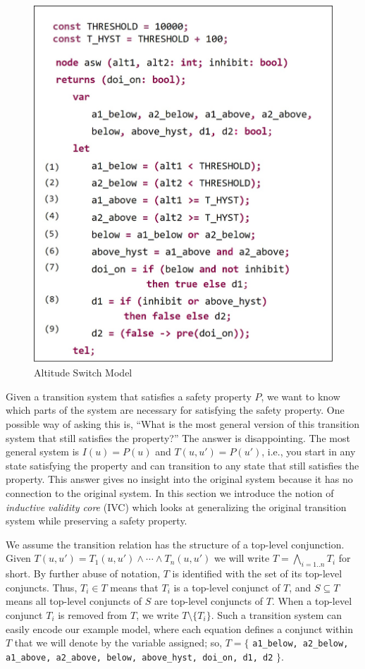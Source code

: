 \begin{figure}
\centering
\includegraphics[width=0.7\columnwidth]{figs/code.jpg}
\vspace{-0.1in}
\caption{Altitude Switch Model }
\label{fig:asw}
\end{figure}



Given a transition system that satisfies a safety property $P$, we
want to know which parts of the system are necessary for satisfying
the safety property. One possible way of asking this is, ``What is the
most general version of this transition system that still satisfies
the property?'' The answer is disappointing. The most general system is
$I(u) = P(u)$ and $T(u, u') = P(u')$, i.e., you start in any state
satisfying the property and can transition to any state that still
satisfies the property. This answer gives no insight into the original
system because it has no connection to the original system. In this
section we introduce the notion of {\em inductive validity core} (IVC)
which looks at generalizing the original transition system while
preserving a safety property.

We assume the transition relation has the structure of a top-level conjunction.  Given $T(u, u') = T_1(u, u') \land \cdots \land T_n(u, u')$ we will write $T = \bigwedge_{i=1..n}T_i$ for short.
By further abuse of notation,
$T$ is identified with the set of its top-level conjuncts. Thus, $T_i \in
T$ means that $T_i$ is a top-level conjunct of $T$, and $S
\subseteq T$ means all top-level conjuncts of $S$ are top-level
conjuncts of $T$. When a top-level conjunct $T_i$ is removed from $T$, we write $T \setminus \{T_i\}$. Such a transition system can easily encode our example model, where each equation defines a conjunct within $T$ that we will denote by the variable assigned; so, $T = \{$ {\small \texttt{a1\_below, a2\_below, a1\_above, a2\_above, below, above\_hyst, doi\_on, d1, d2}} $\}$.

